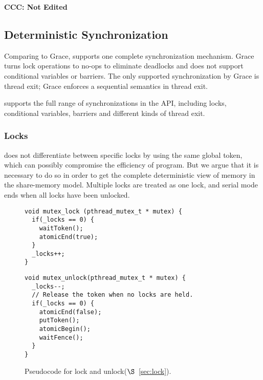 \textbf{CCC: Not Edited}

\subsection{Deterministic Synchronization}
\label{sec:synchronization}

Comparing to Grace, \dthreads{} supports one complete synchronization
mechanism.  Grace turns lock operations to no-ops to eliminate
deadlocks and does not support conditional variables or barriers.  The
only supported synchronization by Grace is thread exit; Grace enforces
a sequential semantics in thread exit.

\dthreads{} supports the full range of synchronizations in the
\pthreads{} API, including locks, conditional variables, barriers and
different kinds of thread exit.

\subsubsection{Locks}

\dthreads{} does not differentiate between specific locks by using the same global token, 
which can possibly compromise the efficiency of program. But we argue
that it is necessary to do so in order to get the complete
deterministic view of memory in the share-memory model.
Multiple locks are treated as one lock, and serial mode ends
when all locks have been unlocked. 




\begin{figure}
\begin{lstlisting}
void mutex_lock (pthread_mutex_t * mutex) {
  if(_locks == 0) {
    waitToken();
    atomicEnd(true);
  }
  _locks++;
}
\end{lstlisting}
\begin{lstlisting}
void mutex_unlock(pthread_mutex_t * mutex) {
  _locks--;
  // Release the token when no locks are held.
  if(_locks == 0) {
    atomicEnd(false);
    putToken();
    atomicBegin();
    waitFence();
  }
}
\end{lstlisting}
\caption{Pseudocode for lock and unlock($\S$~\ref{sec:lock}).
\label{fig:lock}}
\end{figure}

